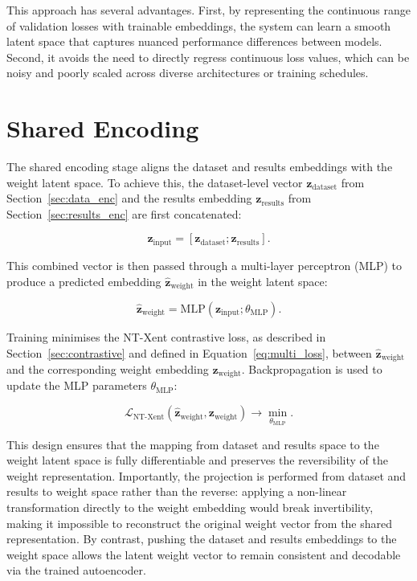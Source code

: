 This approach has several advantages. First, by representing the continuous range of validation losses with trainable embeddings, the system can learn a smooth latent space that captures nuanced performance differences between models. Second, it avoids the need to directly regress continuous loss values, which can be noisy and poorly scaled across diverse architectures or training schedules.

\section{Shared Encoding}
\label{sec:shared_enc}

The shared encoding stage aligns the dataset and results embeddings with the weight latent space. To achieve this, the dataset-level vector $\mathbf{z}_{\text{dataset}}$ from Section~\ref{sec:data_enc} and the results embedding $\mathbf{z}_{\text{results}}$ from Section~\ref{sec:results_enc} are first concatenated:

\[
\mathbf{z}_{\text{input}} = [\mathbf{z}_{\text{dataset}}; \mathbf{z}_{\text{results}}].
\]

This combined vector is then passed through a multi-layer perceptron (MLP) to produce a predicted embedding $\hat{\mathbf{z}}_{\text{weight}}$ in the weight latent space:

\[
\hat{\mathbf{z}}_{\text{weight}} = \text{MLP}(\mathbf{z}_{\text{input}}; \theta_{\text{MLP}}).
\]

Training minimises the NT-Xent contrastive loss, as described in Section~\ref{sec:contrastive} and defined in Equation~\ref{eq:multi_loss}, between $\hat{\mathbf{z}}_{\text{weight}}$ and the corresponding weight embedding $\mathbf{z}_{\text{weight}}$. Backpropagation is used to update the MLP parameters $\theta_{\text{MLP}}$:

\[
\mathcal{L}_{\text{NT-Xent}}(\hat{\mathbf{z}}_{\text{weight}}, \mathbf{z}_{\text{weight}}) \rightarrow \min_{\theta_{\text{MLP}}}.
\]

This design ensures that the mapping from dataset and results space to the weight latent space is fully differentiable and preserves the reversibility of the weight representation. Importantly, the projection is performed from dataset and results to weight space rather than the reverse: applying a non-linear transformation directly to the weight embedding would break invertibility, making it impossible to reconstruct the original weight vector from the shared representation. By contrast, pushing the dataset and results embeddings to the weight space allows the latent weight vector to remain consistent and decodable via the trained autoencoder.
